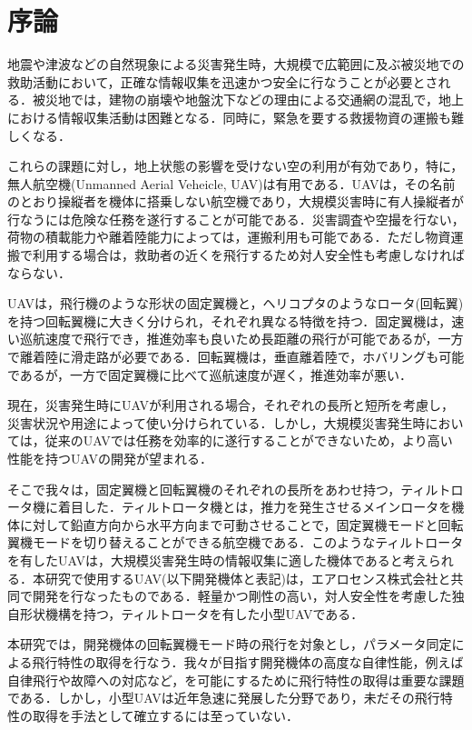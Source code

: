
\chapter{序論}
\label{intro}

地震や津波などの自然現象による災害発生時，大規模で広範囲に及ぶ被災地での救助活動において，正確な情報収集を迅速かつ安全に行なうことが必要とされる．被災地では，建物の崩壊や地盤沈下などの理由による交通網の混乱で，地上における情報収集活動は困難となる．同時に，緊急を要する救援物資の運搬も難しくなる．

これらの課題に対し，地上状態の影響を受けない空の利用が有効であり，特に，無人航空機(Unmanned Aerial Veheicle, UAV)は有用である．UAVは，その名前のとおり操縦者を機体に搭乗しない航空機であり，大規模災害時に有人操縦者が行なうには危険な任務を遂行することが可能である．災害調査や空撮を行ない，荷物の積載能力や離着陸能力によっては，運搬利用も可能である．ただし物資運搬で利用する場合は，救助者の近くを飛行するため対人安全性も考慮しなければならない．

UAVは，飛行機のような形状の固定翼機と，ヘリコプタのようなロータ(回転翼)を持つ回転翼機に大きく分けられ，それぞれ異なる特徴を持つ．固定翼機は，速い巡航速度で飛行でき，推進効率も良いため長距離の飛行が可能であるが，一方で離着陸に滑走路が必要である．回転翼機は，垂直離着陸で，ホバリングも可能であるが，一方で固定翼機に比べて巡航速度が遅く，推進効率が悪い．

現在，災害発生時にUAVが利用される場合，それぞれの長所と短所を考慮し，災害状況や用途によって使い分けられている．しかし，大規模災害発生時においては，従来のUAVでは任務を効率的に遂行することができないため，より高い性能を持つUAVの開発が望まれる．

そこで我々は，固定翼機と回転翼機のそれぞれの長所をあわせ持つ，ティルトロータ機に着目した．ティルトロータ機とは，推力を発生させるメインロータを機体に対して鉛直方向から水平方向まで可動させることで，固定翼機モードと回転翼機モードを切り替えることができる航空機である．このようなティルトロータを有したUAVは，大規模災害発生時の情報収集に適した機体であると考えられる．本研究で使用するUAV(以下開発機体と表記)は，エアロセンス株式会社と共同で開発を行なったものである．軽量かつ剛性の高い，対人安全性を考慮した独自形状機構を持つ，ティルトロータを有した小型UAVである．

本研究では，開発機体の回転翼機モード時の飛行を対象とし，パラメータ同定による飛行特性の取得を行なう．我々が目指す開発機体の高度な自律性能，例えば自律飛行や故障への対応など，を可能にするために飛行特性の取得は重要な課題である．しかし，小型UAVは近年急速に発展した分野であり，未だその飛行特性の取得を手法として確立するには至っていない．

